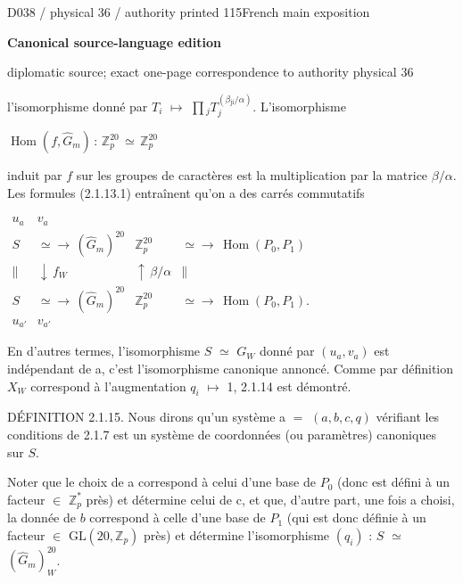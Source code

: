 \documentclass[9pt]{article}
\newcommand{\CanonText}[1]{\par{\fontsize{8.0}{9.35}\selectfont\RaggedRight #1\par}\vspace{2.2pt}}
\newcommand{\CanonDisplay}[1]{\par\vspace{1.2pt}\begin{center}{\fontsize{7.2}{8.4}\selectfont\(\displaystyle #1\)}\end{center}\vspace{1.2pt}}
\newenvironment{CanonMathBlock}{\par\vspace{1.2pt}\begin{center}\fontsize{6.8}{8.0}\selectfont\(\displaystyle}{\)\end{center}\vspace{1.2pt}}
\newcommand{\LayerTitle}{Canonical source-language edition}
\begin{document}
\noindent\begin{minipage}[t][\dimexpr\textheight-5pt\relax][t]{\textwidth}
{\sffamily\fontsize{7.3}{8.2}\selectfont\color{Quiet} D038 / physical 36 / authority printed 115\hfill French main exposition}
\par{}\vspace{4.5pt}
{\sffamily\fontsize{10.4}{11.6}\selectfont\bfseries\color{Accent} \LayerTitle}
\par{\sffamily\fontsize{6.7}{7.7}\selectfont\color{Quiet} diplomatic source; exact one-page correspondence to authority physical 36}
\vspace{5pt}
\CanonText{l'isomorphisme donné par \(T_{i}\) \(\mapsto{}\) \(\prod{}_{j}T_{j}^{(\beta{}_{\mathrm{ji}}/\alpha{})}\). L'isomorphisme}
\CanonDisplay{\operatorname{Hom}(f,\widehat{G}_{m})\,:\,\mathbb{Z}_{p}^{20}\,\simeq{}\,\mathbb{Z}_{p}^{20}}
\CanonText{induit par \(f\) sur les groupes de caractères est la multiplication par la matrice \(\beta{}/\alpha{}\). Les formules (2.1.13.1) entraînent qu'on a des carrés commutatifs}
\begin{CanonMathBlock}
\begin{array}{cccc}
u_{a} & v_{a} & {} & {}\\
S & \simeq{}\to{}\,(\widehat{G}_{m})^{20} & \mathbb{Z}_{p}^{20} & \simeq{}\to{}\,\operatorname{Hom}(P_{0},P_{1})\\
\parallel{} & \downarrow{}\,f_{W} & \uparrow{}\,\beta{}/\alpha{} & \parallel{}\\
S & \simeq{}\to{}\,(\widehat{G}_{m})^{20} & \mathbb{Z}_{p}^{20} & \simeq{}\to{}\,\operatorname{Hom}(P_{0},P_{1}).\\
u_{a'} & v_{a'} & {} & {}
\end{array}
\end{CanonMathBlock}
\CanonText{En d'autres termes, l'isomorphisme \(S\) \(\simeq{}\) \(G_{W}\) donné par \((u_{a},v_{a})\) est indépendant de a, c'est l'isomorphisme canonique annoncé. Comme par définition \(X_{W}\) correspond à l'augmentation \(q_{i}\) \(\mapsto{}\) 1, 2.1.14 est démontré.}
\CanonText{DÉFINITION 2.1.15. Nous dirons qu'un système a \(=\) \((a,b,c,q)\) vérifiant les conditions de 2.1.7 est un système de coordonnées (ou paramètres) canoniques sur \(S\).}
\CanonText{Noter que le choix de a correspond à celui d'une base de \(P_{0}\) (donc est défini à un facteur \(\in{}\) \(\mathbb{Z}_{p}^{*}\) près) et détermine celui de c, et que, d'autre part, une fois a choisi, la donnée de \(b\) correspond à celle d'une base de \(P_{1}\) (qui est donc définie à un facteur \(\in{}\) \(\mathrm{GL}(20,\mathbb{Z}_{p})\) près) et détermine l'isomorphisme \((q_{i})\) : \(S\) \(\simeq{}\) \((\widehat{G}_{m})_{W}^{20}\).}

\end{minipage}
\end{document}

